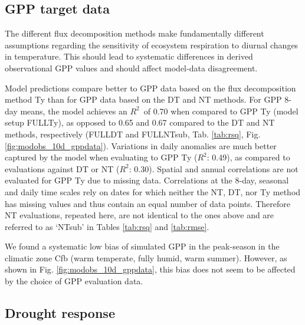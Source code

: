 \documentclass[gmd, manuscript]{copernicus}
\newcommand{\rsq}{$R^2$}
\begin{document}
\subsection{GPP target data}
\label{sec:results_gppdata}

The different flux decomposition methods make fundamentally different assumptions regarding the sensitivity of ecosystem respiration to diurnal changes in temperature. This should lead to systematic differences in derived observational GPP values and should affect model-data disagreement.

Model predictions compare better to GPP data based on the flux decomposition method Ty \citep{wang17natpl} than for GPP data based on the DT and NT methods. For GPP  8-day means, the model achieves an \rsq\ of 0.70 when compared to GPP Ty (model setup FULL\textunderscore Ty), as opposed to 0.65 and 0.67 compared to the DT and NT methods, respectively (FULL\textunderscore DT and FULL\textunderscore NTsub, Tab. \ref{tab:rsq}, Fig. \ref{fig:modobs_10d_gppdata}). Variations in daily anomalies are much better captured by the model when evaluating to GPP Ty (\rsq : 0.49), as compared to evaluations against DT or NT (\rsq : 0.30). Spatial and annual correlations are not evaluated for GPP Ty due to missing data. Correlations at the 8-day, seasonal and daily time scales rely on dates for which neither the NT, DT, nor Ty method has missing values and thus contain an equal number of data points. Therefore NT evaluations, repeated here, are not identical to the ones above and are referred to as `NTsub' in Tables \ref{tab:rsq} and \ref{tab:rmse}. 
 
We found a systematic low bias of simulated GPP in the peak-season in the climatic zone Cfb (warm temperate, fully humid, warm summer). However, as shown in Fig. \ref{fig:modobs_10d_gppdata}, this bias does not seem to be affected by the choice of GPP evaluation data.

\subsection{Drought response}
\label{sec:results_droughtresponse}
\end{document}
